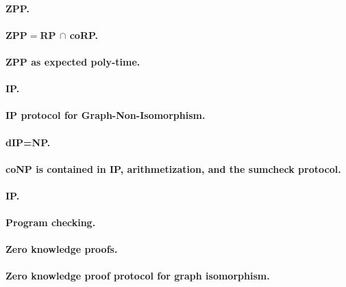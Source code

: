 \documentclass[11pt,a4paper]{article}
\theoremstyle{definition}
\begin{document}
\paragraph{ZPP.}

\paragraph{ZPP$=$RP $\cap$ coRP.}

\paragraph{ZPP as expected poly-time.}

\paragraph{IP.}

\paragraph{IP protocol for Graph-Non-Isomorphism.}

\paragraph{dIP=NP.}

\paragraph{coNP is contained in IP, arithmetization, and the sumcheck protocol.}

\paragraph{IP.}

\paragraph{Program checking.}

\paragraph{Zero knowledge proofs.}

\paragraph{Zero knowledge proof protocol for graph isomorphism.}
\end{document}

